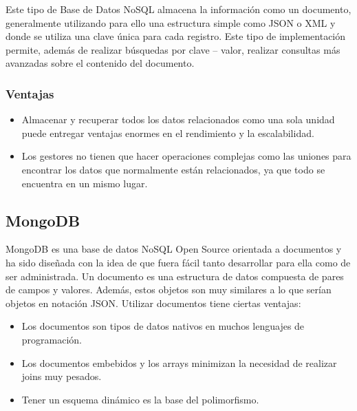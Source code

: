 \documentclass[preprint,12pt]{elsarticle}
\begin{document}
Este tipo de Base de Datos NoSQL almacena la información como un documento, generalmente utilizando para ello una estructura simple como JSON o XML y donde se utiliza una clave única para cada registro. Este tipo de implementación permite, además de realizar búsquedas por clave – valor, realizar consultas más avanzadas sobre el contenido del documento.
\cite{BDnoSQLMongodb}
\subsubsection{\textbf{Ventajas}}
\begin{itemize}

\item Almacenar y recuperar todos los datos relacionados como una sola unidad puede entregar ventajas enormes en el rendimiento y la escalabilidad.
\item Los gestores no tienen que hacer operaciones complejas como las uniones para encontrar los datos que normalmente están relacionados, ya que todo se encuentra en un mismo lugar.
\end{itemize}

\cite{BDnoSQLMongodb}
\subsection {\textbf{MongoDB}}
MongoDB es una base de datos NoSQL Open Source orientada a documentos y ha sido diseñada con la idea de que fuera fácil tanto desarrollar para ella como de ser administrada. Un documento es una estructura de datos compuesta de pares de campos y valores. Además, estos objetos son muy similares a lo que serían objetos en notación JSON. \newline
Utilizar documentos tiene ciertas ventajas:
\begin{itemize}

\item Los documentos son tipos de datos nativos en muchos lenguajes de programación.
\item Los documentos embebidos y los arrays minimizan la necesidad de realizar joins muy pesados.
\item Tener un esquema dinámico es la base del polimorfismo.

\end{itemize}
 \cite{MongoDB}
\end{document}
